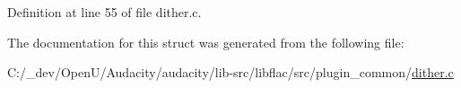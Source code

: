 Definition at line 55 of file dither.\+c.



The documentation for this struct was generated from the following file\+:\begin{DoxyCompactItemize}
\item 
C\+:/\+\_\+dev/\+Open\+U/\+Audacity/audacity/lib-\/src/libflac/src/plugin\+\_\+common/\hyperlink{libflac_2src_2plugin__common_2dither_8c}{dither.\+c}\end{DoxyCompactItemize}
